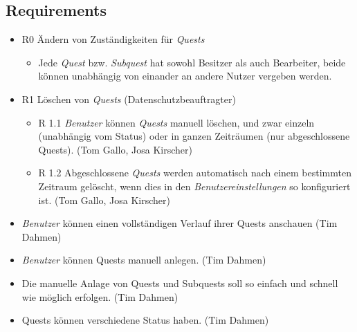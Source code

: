 \documentclass{article}
\begin{document}
\subsection{Requirements}

\begin{itemize}
\item R0 Ändern von Zuständigkeiten für \textit{Quests}
    \begin{itemize}
        \item Jede \textit{Quest} bzw. \textit{Subquest} hat sowohl Besitzer als auch Bearbeiter, beide können unabhängig von einander an andere Nutzer vergeben werden.
    \end{itemize}

\item R1 Löschen von \textit{Quests} (Datenschutzbeauftragter) 
	\begin{itemize}
	\item R 1.1 \textit{Benutzer} können \textit{Quests} manuell löschen, und zwar einzeln (unabhängig vom Status) oder in ganzen Zeiträumen (nur abgeschlossene Quests). (Tom Gallo, Josa Kirscher) 
	\item R 1.2 Abgeschlossene \textit{Quests} werden automatisch nach einem bestimmten Zeitraum gelöscht, wenn dies in den \textit{Benutzereinstellungen} so konfiguriert ist. (Tom Gallo, Josa Kirscher)
	\end{itemize}

\item \textit{Benutzer} können einen vollständigen Verlauf ihrer Quests anschauen (Tim Dahmen) 

\item \textit{Benutzer} können Quests manuell anlegen. (Tim Dahmen) 
\item Die manuelle Anlage von Quests und Subquests soll so einfach und schnell wie möglich erfolgen. (Tim Dahmen) 
\item Quests können verschiedene Status haben. (Tim Dahmen) 


\end{itemize}
\end{document}
